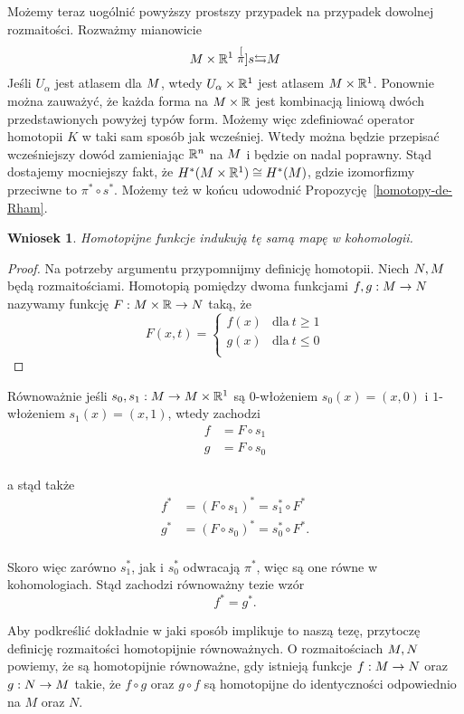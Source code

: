 \documentclass[licencjacka]{pracamgr}
\theoremstyle{definition}
\theoremstyle{definition}
\theoremstyle{plain}
\theoremstyle{plain}
\theoremstyle{plain}
\theoremstyle{plain}
\newtheorem{wniosek}{Wniosek}[section]
\def\M{\ensuremath M}
\def\N{\ensuremath N}
\def\R{\ensuremath\mathbb{R}}
\begin{document}
Możemy teraz uogólnić powyższy prostszy przypadek na przypadek dowolnej
rozmaitości. Rozważmy mianowicie
\[
 \M \times \R^1 \stackrel[\pi]{s}{\leftrightarrows} \M
\]
Jeśli ${U_\alpha}$ jest atlasem dla $\M$, wtedy ${U_\alpha \times \R^1}$ jest
atlasem $\M \times \R^1$. Ponownie można zauważyć, że każda forma na $\M \times
\R$ jest kombinacją liniową dwóch przedstawionych powyżej typów form.  Możemy
więc zdefiniować operator homotopii $K$ w taki sam sposób jak wcześniej.  Wtedy
można będzie przepisać wcześniejszy dowód zamieniając $\R^n$ na $\M$ i będzie
on nadal poprawny. Stąd dostajemy mocniejszy fakt, że $ H^\ast( \M \times
\R^1) \cong H^\ast( \M) $, gdzie izomorfizmy przeciwne to $\pi^\ast \circ
s^\ast$. Możemy też w końcu udowodnić Propozycję~\ref{homotopy-de-Rham}.

\begin{wniosek}
Homotopijne funkcje indukują tę samą mapę w kohomologii.
\end{wniosek}
\begin{proof}
Na potrzeby argumentu przypomnijmy definicję homotopii.  Niech $\N, \M$ będą
rozmaitościami.  Homotopią pomiędzy dwoma funkcjami $f,g: \M \rightarrow \N$
nazywamy funkcję $F: \M \times \R \rightarrow \N$ taką, że
\[
F(x,t) = 
\begin{cases}
f(x) & \text{dla}~t \geq 1 \\
g(x) & \text{dla}~t \leq 0 \\
\end{cases}
\]
\end{proof}
Równoważnie jeśli $s_0,s_1: \M \rightarrow  \M \times \R^1$ są $0$-włożeniem
$s_0(x) = (x, 0)$ i $1$-włożeniem $s_1(x) = (x,1)$, wtedy zachodzi
\begin{align*}
f &= F \circ s_1 \\
g &= F \circ s_0 \\
\end{align*}

a stąd także
\begin{align*}
f^\ast &= (F \circ s_1)^\ast = s_1^\ast \circ F^\ast \\
g^\ast &= (F \circ s_0)^\ast = s_0^\ast \circ F^\ast. \\
\end{align*}

Skoro więc zarówno $s_1^\ast$, jak i $s_0^\ast$ odwracają $\pi^\ast$, więc
są one równe w kohomologiach. Stąd zachodzi równoważny tezie wzór
\[
f^\ast = g^\ast.
\] 

Aby podkreślić dokładnie w jaki sposób implikuje to naszą tezę, przytoczę
definicję rozmaitości homotopijnie równoważnych. O rozmaitościach $\M, \N$
powiemy, że są homotopijnie równoważne, gdy istnieją funkcje
$f: \M \rightarrow \N$ oraz $g: \N \rightarrow \M$ takie, że
$f \circ g$ oraz $g \circ f$ są homotopijne do identyczności odpowiednio
na $M$ oraz $N$. \\
\end{document}
